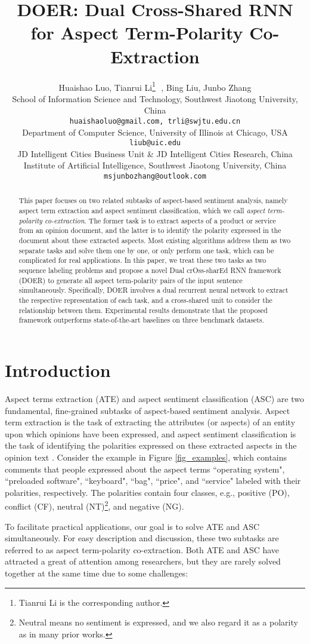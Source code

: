 \documentclass[11pt,a4paper]{article}
\title{DOER: Dual Cross-Shared RNN for Aspect Term-Polarity Co-Extraction}
\author{Huaishao Luo, Tianrui Li\thanks{\;\;Tianrui Li is the corresponding author.}\,\ , Bing Liu, Junbo Zhang\\
  School of Information Science and Technology, Southwest Jiaotong University, China \\
  {\tt huaishaoluo@gmail.com, trli@swjtu.edu.cn} \\
  Department of Computer Science, University of Illinois at Chicago, USA \\
  {\tt liub@uic.edu} \\
JD Intelligent Cities Business Unit \& JD Intelligent Cities Research, China \\
  Institute of Artificial Intelligence, Southwest Jiaotong University, China \\
  {\tt msjunbozhang@outlook.com}
  }
\date{}
\begin{document}
	\maketitle
\begin{abstract}
		This paper focuses on two related subtasks of aspect-based sentiment analysis, namely aspect term extraction and aspect sentiment classification, which we call \textit{aspect term-polarity co-extraction}. The former task is to extract aspects of a product or service from an opinion document, and the latter is to identify the polarity expressed in the document about these extracted aspects. Most existing algorithms address them as two separate tasks and solve them one by one, or only perform one task, which can be complicated for real applications. In this paper, we treat these two tasks as two sequence labeling problems and propose a novel Dual crOss-sharEd RNN framework (DOER) to generate all aspect term-polarity pairs of the input sentence simultaneously. Specifically, DOER involves a dual recurrent neural network to extract the respective representation of each task, and a cross-shared unit to consider the relationship between them. Experimental results demonstrate that the proposed framework outperforms state-of-the-art baselines on three benchmark datasets.
	\end{abstract}
	
\section{Introduction}
	\label{sec_introduction}
	Aspect terms extraction (ATE) and aspect sentiment classification (ASC) are two fundamental, fine-grained subtasks of aspect-based sentiment analysis. Aspect term extraction is the task of extracting the attributes (or aspects) of an entity upon which opinions have been expressed, and aspect sentiment classification is the task of identifying the polarities expressed on these extracted aspects in the opinion text \cite{Hu2004}. Consider the example in Figure \ref{fig_examples}, which contains comments that people expressed about the aspect terms ``operating system", ``preloaded software", ``keyboard", ``bag", ``price", and ``service" labeled with their polarities, respectively. The polarities contain four classes, e.g., positive (PO), conflict (CF), neutral (NT)\footnote{Neutral means no sentiment is expressed, and we also regard it as a polarity as in many prior works.}, and negative (NG). 
	
	To facilitate practical applications, our goal is to solve ATE and ASC simultaneously. For easy description and discussion, these two subtasks are referred to as aspect term-polarity co-extraction. Both ATE and ASC have attracted a great of attention among researchers, but they are rarely solved together at the same time due to some challenges:
	
\end{document}
